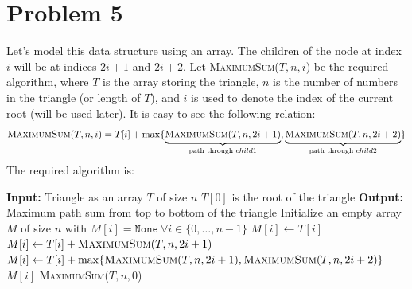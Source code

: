\documentclass{article}
\begin{document}
\section{Problem 5}
  Let's model this data structure using an array.
  The children of the node at index $i$ will be at indices $2i + 1$ and $2i + 2$.
  Let \textsc{MaximumSum}($T, n, i$) be the required algorithm, where $T$ is the array storing the triangle, $n$ is the number of numbers in the triangle (or length of $T$), and $i$ is used to denote the index of the current root (will be used later).
  It is easy to see the following relation:
  \[
    \textsc{MaximumSum}(T, n, i) = T[i] + \max\{
      \underbrace{\textsc{MaximumSum}(T, n, 2i+1)}_{\text{path through } child1},
      \underbrace{\textsc{MaximumSum}(T, n, 2i+2)}_{\text{path through } child2}
    \}
  \]
  The required algorithm is:
  \begin{algorithm}
    \caption{Maximum Path Sum in Triangle}
    \begin{algorithmic}[1]
      \State \textbf{Input:} Triangle as an array $T$ of size $n$
      \Comment $T[0]$ is the root of the triangle
      \State \textbf{Output:} Maximum path sum from top to bottom of the triangle
      \State Initialize an empty array $M$ of size $n$ with $M[i] = \texttt{None} ~ \forall i \in \{0, \ldots, n-1\}$
            \State $M[i] \gets T[i]$
            \State $M[i] \gets T[i] + \textsc{MaximumSum}(T, n, 2i+1)$
          \Else
            \State $M[i] \gets T[i] + \max\{\textsc{MaximumSum}(T, n, 2i+1), \textsc{MaximumSum}(T, n, 2i+2)\}$
          \EndIf
        \EndIf
        \State \Return $M[i]$
      \EndFunction
      \State \Return \textsc{MaximumSum}($T, n, 0$)
    \end{algorithmic}
  \end{algorithm}
\end{document}
